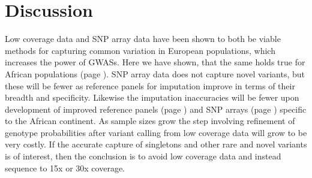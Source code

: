 \section{Discussion}

Low coverage data and SNP array data have been shown to both be viable methods for capturing common variation in European populations\cite{Pasaniuc2012}, which increases the power of \glspl{GWAS}. Here we have shown, that the same holds true for African populations (page \pageref{subsec:result_downsampling_sensspec}). SNP array data does not capture novel variants, but these will be fewer as reference panels for imputation improve in terms of their breadth and specificity. Likewise the imputation inaccuracies will be fewer upon development of improved reference panels (page \pageref{ch:reference_panel}) and SNP arrays (page \pageref{ch:chip_design}) specific to the African continent.
As sample sizes grow the step involving refinement of genotype probabilities after variant calling from low coverage data will grow to be very costly. If the accurate capture of singletons and other rare and novel variants is of interest, then the conclusion is to avoid low coverage data and instead sequence to 15x or 30x coverage.
